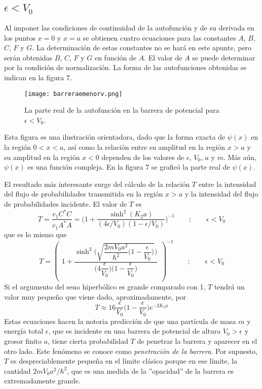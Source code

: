 \documentclass[12pt,a4paper]{article}
\def\e{{\epsilon}} %
\begin{document}
\subsection{$\e<V_{0}$}

Al imponer las condiciones de continuidad de la autofunción y de su derivada en los puntos $x=0$ y $x=a$ se obtienen cuatro ecuaciones para las constantes $A$, $B$, $C$, $F$ y $G$. La determinación de estas constantes no se hará en este apunte, pero serán obtenidas $B$, $C$, $F$ y $G$ en función de $A$. El valor de $A$ se puede determinar por la condición de normalización. La forma de las autofunciones obtenidas se indican en la figura 7.

\begin{figure}[ht!]
\begin{center}
\texttt{[image: barreraemenorv.png]}
\caption{La parte real de la autofunción en la barrera de potencial para $\e < V_{0}$.}
\end{center}
\end{figure}

Esta figura es una ilustración orientadora, dado que la forma exacta de $\psi(x)$ en la región $0<x<a$, así como la relación entre su amplitud en la región $x>a$ y su amplitud en la región $x<0$ dependen de los valores de $\e$, $V_{0}$, $a$ y $m$. Más aún, $\psi(x)$ es una función compleja. En la figura 7 se graficó la parte real de $\psi(x)$.

El resultado más interesante surge del cálculo de la relación $T$ entre la intensidad del flujo de probabilidades transmitida en la región $x>a$ y la intensidad del flujo de probabilidades incidente. El valor de $T$ es
\[ T=\frac{v_{1}C^{\ast}C}{v_{1}A^{\ast}A}=\bigg( 1+\frac{\sinh^{2}(K_{2}a)}{(4\e/V_{0})(1-\e/V_{0})} \bigg)^{-1} \qquad ; \qquad \e<V_{0} \]
que es lo mismo que
\[ T=
\left(
\begin{array}{l}
1+\dfrac{\sinh^{2} \bigg( \sqrt{\dfrac{2mV_{0}a^{2}}{\hbar^{2}}\bigg( 1-\dfrac{\e}{V_{0}} \bigg)} \bigg)}{\bigg( 4\dfrac{\e}{V_{0}} \bigg) \bigg( 1- \dfrac{\e}{V_{0}} \bigg)} \\
\end{array}
\right)
^{-1} \qquad ; \qquad \e < V_{0}
\]
Si el argumento del seno hiperbólico es grande comparado con 1, $T$ tendrá un valor muy pequeño que viene dado, aproximadamente, por
\[ T \approx 16 \frac{\e}{V_{0}} \bigg( 1-\frac{\e}{V_{0}} \bigg)e^{-2K_{2}a} \]
Estas ecuaciones hacen la notoria predicción de que una partícula de masa $m$ y energía total $\e$, que es incidente en una barrera de potencial de altura $V_{0}>\e$ y grosor finito $a$, tiene cierta probabilidad $T$ de penetrar la barrera y aparecer en el otro lado. Este fenómeno se conoce como \emph{penetración de la barrera}. Por supuesto, $T$ es despreciablemente pequeña en el límite clásico porque en ese límite, la cantidad $2mV_{0}a^{2}/\hbar^{2}$, que es una medida de la ''opacidad'' de la barrera es extremadamente grande.
\end{document}
